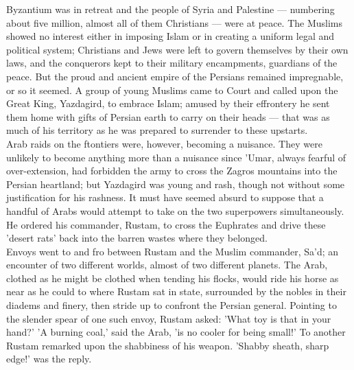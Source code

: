 \documentclass[11pt, b5paper, twoside]{book}
\begin{document}
Byzantium was in retreat and the people of Syria and Palestine --- numbering about five million, almost all of them Christians --- were at peace. The Muslims showed no interest either in imposing Islam or in creating a uniform legal and political system; Christians and Jews were left to govern themselves by their own laws, and the conquerors kept to their military encampments, guardians of the peace. But the proud and ancient empire of the Persians remained impregnable, or so it seemed. A group of young Muslims came to Court and called upon the Great King, Yazdagird, to embrace Islam; amused by their effrontery he sent them home with gifts of Persian earth to carry on their heads --- that was as much of his territory as he was prepared to surrender to these upstarts. \\

Arab raids on the ftontiers were, however, becoming a nuisance. They were unlikely to become anything more than a nuisance since 'Umar, always fearful of over-extension, had forbidden the army to cross the Zagros mountains into the Persian heartland; but Yazdagird was young and rash, though not without some justification for his rashness. It must have seemed absurd to suppose that a handful of Arabs would attempt to take on the two superpowers simultaneously. He ordered his commander, Rustam, to cross the Euphrates and drive these 'desert rats' back into the barren wastes where they belonged. \\

Envoys went to and fro between Rustam and the Muslim commander, Sa'd; an encounter of two different worlds, almost of two different planets. The Arab, clothed as he might be clothed when tending his flocks, would ride his horse as near as he could to where Rustam sat in state, surrounded by the nobles in their diadems and finery, then stride up to confront the Persian general. Pointing to the slender spear of one such envoy, Rustam asked: 'What toy is that in your hand?' 'A burning coal,' said the Arab, 'is no cooler for being small!' To another Rustam remarked upon the shabbiness of his weapon. 'Shabby sheath, sharp edge!' was the reply. \\
\end{document}
